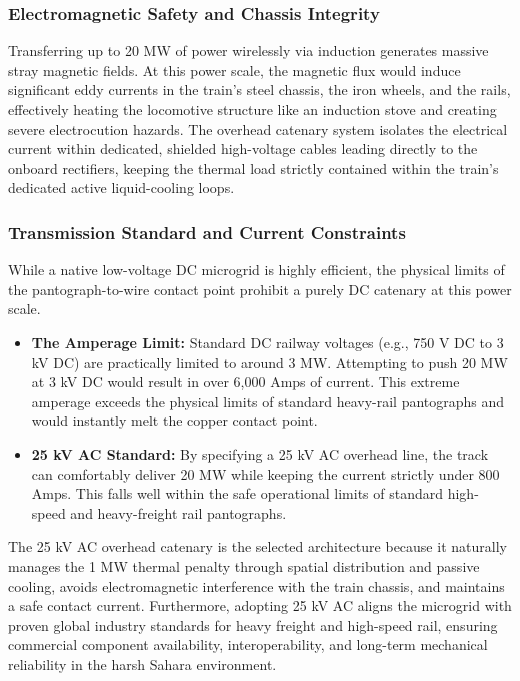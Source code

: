 \subsubsection*{Electromagnetic Safety and Chassis Integrity}
Transferring up to 20 MW of power wirelessly via induction generates massive stray magnetic fields. At this power scale, the magnetic flux would induce significant eddy currents in the train's steel chassis, the iron wheels, and the rails, effectively heating the locomotive structure like an induction stove and creating severe electrocution hazards. The overhead catenary system isolates the electrical current within dedicated, shielded high-voltage cables leading directly to the onboard rectifiers, keeping the thermal load strictly contained within the train's dedicated active liquid-cooling loops.

\subsubsection*{Transmission Standard and Current Constraints}
While a native low-voltage DC microgrid is highly efficient, the physical limits of the pantograph-to-wire contact point prohibit a purely DC catenary at this power scale. 
\begin{itemize}
    \item \textbf{The Amperage Limit:} Standard DC railway voltages (e.g., 750 V DC to 3 kV DC) are practically limited to around 3 MW. Attempting to push 20 MW at 3 kV DC would result in over 6,000 Amps of current. This extreme amperage exceeds the physical limits of standard heavy-rail pantographs and would instantly melt the copper contact point.
    \item \textbf{25 kV AC Standard:} By specifying a 25 kV AC overhead line, the track can comfortably deliver 20 MW while keeping the current strictly under 800 Amps. This falls well within the safe operational limits of standard high-speed and heavy-freight rail pantographs.
\end{itemize}

The 25 kV AC overhead catenary is the selected architecture because it naturally manages the 1 MW thermal penalty through spatial distribution and passive cooling, avoids electromagnetic interference with the train chassis, and maintains a safe contact current. Furthermore, adopting 25 kV AC aligns the microgrid with proven global industry standards for heavy freight and high-speed rail, ensuring commercial component availability, interoperability, and long-term mechanical reliability in the harsh Sahara environment.


